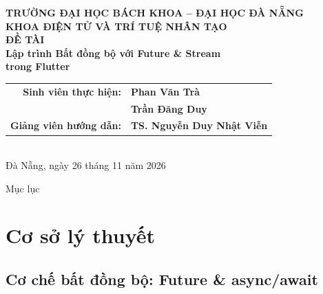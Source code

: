 \documentclass[aspectratio=169,10pt]{beamer}
\begin{document}
\begin{frame}[plain]
  \centering
  \vspace{0.2cm}
  {\large\bfseries TRƯỜNG ĐẠI HỌC BÁCH KHOA -- ĐẠI HỌC ĐÀ NẴNG}\\[3pt]
  {\large\bfseries KHOA ĐIỆN TỬ VÀ TRÍ TUỆ NHÂN TẠO}\\[8pt]
  \vspace{14pt}
  {\normalsize\bfseries ĐỀ TÀI}\\[5pt]
  {\LARGE\bfseries Lập trình Bất đồng bộ với Future \& Stream\\ trong Flutter}\\[14pt]
  \begin{tabular}{rl}
    \textbf{Sinh viên thực hiện:} & \textbf{Phan Văn Trà}\\
                                  & \textbf{Trần Đăng Duy}\\[4pt]
    \textbf{Giảng viên hướng dẫn:} & \textbf{TS. Nguyễn Duy Nhật Viễn}
  \end{tabular}\\[14pt]
  {\normalsize Đà Nẵng, ngày 26 tháng 11 năm 2026}
\end{frame}

\begin{frame}{Mục lục}
  \vspace{6pt}
  \large
  \tableofcontents[subsubsectionstyle=hide]
\end{frame}

\section{Cơ sở lý thuyết}
\subsection{Cơ chế bất đồng bộ: Future \& async/await}
\end{document}
